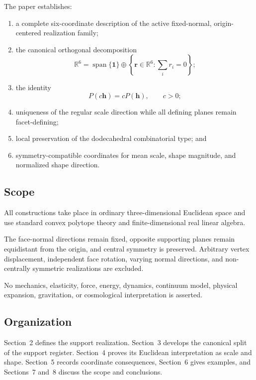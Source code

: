 The paper establishes:

\begin{enumerate}
\item a complete six-coordinate description of the active fixed-normal,
origin-centered realization family;

\item the canonical orthogonal decomposition
\[
\mathbb R^6
=
\operatorname{span}\{\mathbf 1\}
\oplus
\left\{
\mathbf r\in\mathbb R^6:
\sum_i r_i=0
\right\};
\]

\item the identity
\[
P(c\mathbf h)=cP(\mathbf h),
\qquad
c>0;
\]

\item uniqueness of the regular scale direction while all defining planes
remain facet-defining;

\item local preservation of the dodecahedral combinatorial type; and

\item symmetry-compatible coordinates for mean scale, shape magnitude, and
normalized shape direction.
\end{enumerate}

\subsection{Scope}

All constructions take place in ordinary three-dimensional Euclidean space
and use standard convex polytope theory and finite-dimensional real linear
algebra.

The face-normal directions remain fixed, opposite supporting planes remain
equidistant from the origin, and central symmetry is preserved. Arbitrary
vertex displacement, independent face rotation, varying normal directions,
and non-centrally symmetric realizations are excluded.

No mechanics, elasticity, force, energy, dynamics, continuum model,
physical expansion, gravitation, or cosmological interpretation is
asserted.

\subsection{Organization}

Section~2 defines the support realization. Section~3 develops the canonical
split of the support register. Section~4 proves its Euclidean interpretation
as scale and shape. Section~5 records coordinate consequences, Section~6
gives examples, and Sections~7 and~8 discuss the scope and conclusions.
